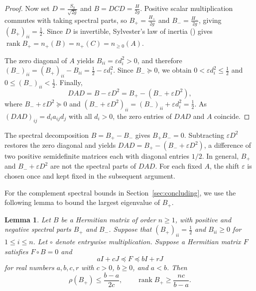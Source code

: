 \documentclass[11pt]{article}
\numberwithin{equation}{section}
\newtheorem{lemma}[theorem]{Lemma}
\theoremstyle{definition}
\theoremstyle{remark}
\DeclareMathOperator{\rank}{rank}
\begin{document}
\begin{proof}
Now set
$D=\frac{S_0}{\sqrt{2g}}$ and $B=DCD=\frac{H}{2g}$.
Positive scalar multiplication commutes with taking spectral parts,
so
$B_+=\frac{H_+}{2g}$ and $B_-=\frac{H_-}{2g}$, giving
$(B_+)_{ii}=\frac12$.
Since $D$ is invertible, Sylvester's law of inertia
(\cite[Lemma~2.4]{KW}) gives
$\rank B_+=n_+(B)=n_+(C)=n_{\geq0}(A)$.

The zero diagonal of $A$ yields
$B_{ii}=\varepsilon d_i^2>0$,
and therefore
$(B_-)_{ii} =(B_+)_{ii}-B_{ii} =\frac12-\varepsilon d_i^2$.
Since $B_-\succeq0$, we obtain
$0<\varepsilon d_i^2\leq\frac12$ and $0\leq(B_-)_{ii}<\frac12$.
Finally,
\[
 DAD=B-\varepsilon D^2
   =B_+-(B_-+\varepsilon D^2),
\]
where $B_-+\varepsilon D^2\succeq0$ and
$(B_-+\varepsilon D^2)_{ii} =(B_-)_{ii}+\varepsilon d_i^2 =\frac12$.
As $(DAD)_{ij}=d_ia_{ij}d_j$ with all $d_i>0$, the zero entries
of $DAD$ and $A$ coincide.
\end{proof}

The spectral decomposition $B=B_+-B_-$ gives $B_+B_-=0$.
Subtracting $\varepsilon D^2$ restores the zero diagonal and yields
$DAD=B_+-(B_-+\varepsilon D^2)$, a difference of two positive
semidefinite matrices each with diagonal entries $1/2$.
In general, $B_+$ and $B_-+\varepsilon D^2$ are not the spectral
parts of $DAD$. For each fixed $A$, the shift $\varepsilon$ is
chosen once and kept fixed in the subsequent argument.

For the complement spectral bounds in Section~\ref{sec:concluding},
we use the following lemma to bound the largest eigenvalue of $B_+$.

\begin{lemma}\label{lem:Schur}
Let $B$ be a Hermitian matrix of order $n\geq1$, with positive
and negative spectral parts $B_+$ and $B_-$. Suppose that
$(B_+)_{ii}=\frac12$ and $B_{ii}\geq0$ for $1\leq i\leq n$.
Let $\circ$ denote entrywise multiplication. Suppose a Hermitian
matrix $F$ satisfies $F\circ B=0$ and
\begin{equation}\label{eq:Schur-sandwich}
 aI+cJ\preceq F\preceq bI+rJ
\end{equation}
for real numbers $a,b,c,r$ with
$c>0$, $b\geq0$, and $a<b$.
Then
\begin{equation}\label{eq:Schur-rank}
 \rho(B_+)\leq\frac{b-a}{2c},
 \qquad
 \rank B_+\geq\frac{nc}{b-a}.
\end{equation}
\end{lemma}
\end{document}
